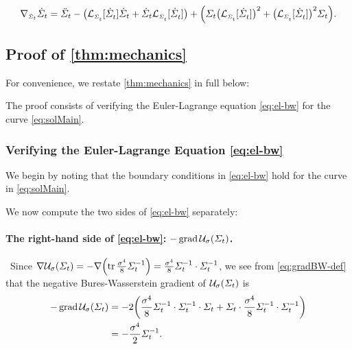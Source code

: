 \begin{align}
\label{eq:coderBW}
\coder = \ddSigcurve -  \parens*{  \lyap \dSigcurve + \dSigcurve\lyap } + \parens*{ \Sigcurve \parens*{\lyap}^2 + \parens*{\lyap}^2 \Sigcurve}.
\end{align}





\subsection{Proof of \cref{thm:mechanics}}
\label{app:proofmechanics}


For convenience, we restate \cref{thm:mechanics} in full below: 
\mechanics*


The proof consists of verifying the Euler-Lagrange equation \eqref{eq:el-bw} for the curve \eqref{eq:solMain}.

\subsubsection{Verifying the Euler-Lagrange Equation \eqref{eq:el-bw}}
\label{sec:verifyEL}
We begin by noting that the boundary conditions in \eqref{eq:el-bw} hold for the curve in \eqref{eq:solMain}. 


We now compute the two sides of \eqref{eq:el-bw} separately:

\paragraph{The right-hand side of \eqref{eq:el-bw}: $-\gradBW\penergyBW$.}
~Since $\nabla \penergyBW = -\nabla \parens*{\tr \frac{\sdev^4}{8} \Sigcurveinv} =  \frac{\sdev^4}{8} \Sigcurveinv\cdot \Sigcurveinv$, we see from \eqref{eq:gradBW-def} that the negative Bures-Wasserstein gradient of $\penergyBW$ is
\begin{align}
\nn
-\gradBW \penergyBW &= -2\parens*{\frac{\sdev^4}{8} \Sigcurveinv\cdot \Sigcurveinv \cdot \Sigcurve + \Sigcurve\cdot \frac{\sdev^4}{8} \Sigcurveinv\cdot \Sigcurveinv } \\
\label{eq:gradBWU}
&= -\frac{\sdev^4}{2} \Sigcurveinv.
\end{align}


